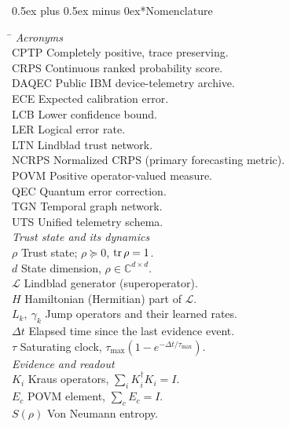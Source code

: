\documentclass[journal]{IEEEtran}
\makeatletter
\def\section{\@startsection{section}{1}{\z@}{1.8ex plus 1ex minus 0.75ex}%
{0.5ex plus 0.5ex minus 0ex}{\normalfont\normalsize\centering\scshape}}
\makeatother
\begin{document}
\section*{Nomenclature}
{\footnotesize\linespread{0.90}\selectfont
\begin{tabbing}
\hspace{1.9cm}\=\kill
\textit{Acronyms}\\[2pt]
CPTP \> Completely positive, trace preserving.\\
CRPS \> Continuous ranked probability score.\\
DAQEC \> Public IBM device-telemetry archive.\\
ECE \> Expected calibration error.\\
LCB \> Lower confidence bound.\\
LER \> Logical error rate.\\
LTN \> Lindblad trust network.\\
NCRPS \> Normalized CRPS (primary forecasting metric).\\
POVM \> Positive operator-valued measure.\\
QEC \> Quantum error correction.\\
TGN \> Temporal graph network.\\
UTS \> Unified telemetry schema.\\[3.5pt]
\textit{Trust state and its dynamics}\\[2pt]
$\rho$ \> Trust state; $\rho \succeq 0$, $\tr\rho = 1$.\\
$d$ \> State dimension, $\rho \in \mathbb{C}^{d\times d}$.\\
$\mathcal{L}$ \> Lindblad generator (superoperator).\\
$H$ \> Hamiltonian (Hermitian) part of $\mathcal{L}$.\\
$L_k,\ \gamma_k$ \> Jump operators and their learned rates.\\
$\Delta t$ \> Elapsed time since the last evidence event.\\
$\tau$ \> Saturating clock, $\tau_{\max}(1-e^{-\Delta t/\tau_{\max}})$.\\[3.5pt]
\textit{Evidence and readout}\\[2pt]
$K_i$ \> Kraus operators, $\sum_i K_i^\dagger K_i = I$.\\
$E_c$ \> POVM element, $\sum_c E_c = I$.\\
$S(\rho)$ \> Von Neumann entropy.\\

\end{tabbing}}
\end{document}
